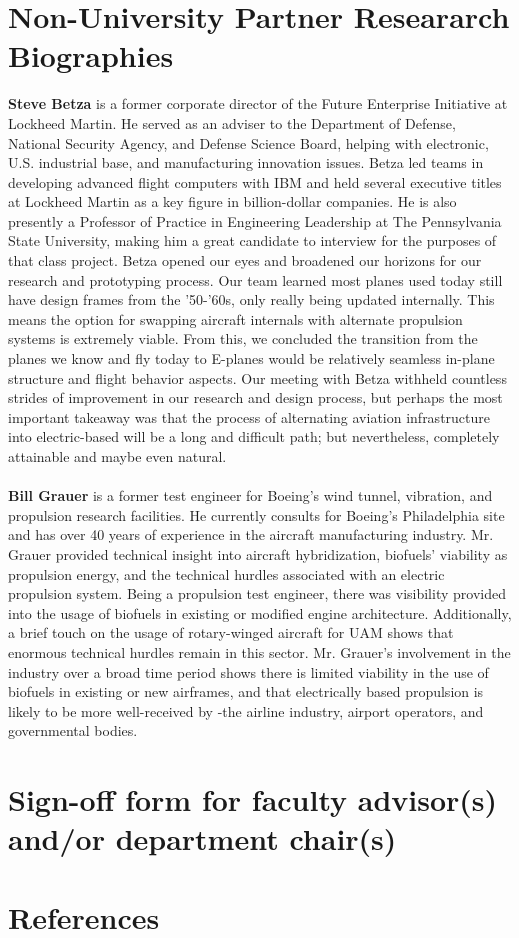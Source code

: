 \documentclass{article}
\begin{document}
\section{Non-University Partner Researarch Biographies}\label{apxC}
\begin{singlespace}
\noindent\textbf{Steve Betza} is a former corporate director of the Future Enterprise Initiative at Lockheed Martin. He served as an adviser to the Department of Defense, National Security Agency, and Defense Science Board, helping with electronic, U.S. industrial base, and manufacturing innovation issues. Betza led teams in developing advanced flight computers with IBM and held several executive titles at Lockheed Martin as a key figure in billion-dollar companies. He is also presently a Professor of Practice in Engineering Leadership at The Pennsylvania State University, making him a great candidate to interview for the purposes of that class project. Betza opened our eyes and broadened our horizons for our research and prototyping process. Our team learned most planes used today still have design frames from the '50-'60s, only really being updated internally. This means the option for swapping aircraft internals with alternate propulsion systems is extremely viable. From this, we concluded the transition from the planes we know and fly today to E-planes would be relatively seamless in-plane structure and flight behavior aspects. Our meeting with Betza withheld countless strides of improvement in our research and design process, but perhaps the most important takeaway was that the process of alternating aviation infrastructure into electric-based will be a long and difficult path; but nevertheless, completely attainable and maybe even natural.\\~\\
\noindent\textbf{Bill Grauer} is a former test engineer for Boeing's wind tunnel, vibration, and propulsion research facilities. He currently consults for Boeing’s Philadelphia site and has over 40 years of experience in the aircraft manufacturing industry. Mr. Grauer provided technical insight into aircraft hybridization, biofuels' viability as propulsion energy, and the technical hurdles associated with an electric propulsion system. Being a propulsion test engineer, there was visibility provided into the usage of biofuels in existing or modified engine architecture. Additionally, a brief touch on the usage of rotary-winged aircraft for UAM shows that enormous technical hurdles remain in this sector. Mr. Grauer’s involvement in the industry over a broad time period shows there is limited viability in the use of biofuels in existing or new airframes, and that electrically based propulsion is likely to be more well-received by -the airline industry, airport operators, and governmental bodies. 

\end{singlespace}
\section{Sign-off form for faculty advisor(s) and/or department chair(s)}\label{apxD}
\section{References}
\printbibliography[heading = none]
\cite{fuelSpecs}
\end{document}
